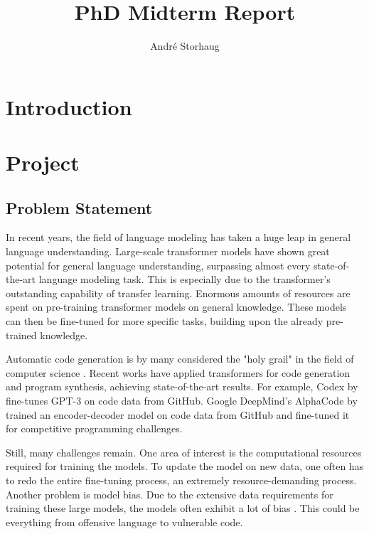 \documentclass{article}
\title{PhD Midterm Report}
\author{Andr\'e Storhaug}
\begin{document}
\maketitle


\tableofcontents


\section{Introduction}


\section{Project}

\subsection{Problem Statement}
In recent years, the field of language modeling has taken a huge leap in general language understanding. Large-scale transformer models \cite{vaswani2017attention} have shown great potential for general language understanding, surpassing almost every state-of-the-art language modeling task. This is especially due to the transformer's outstanding capability of transfer learning. Enormous amounts of resources are spent on pre-training transformer models on general knowledge. These models can then be fine-tuned for more specific tasks, building upon the already pre-trained knowledge.

Automatic code generation is by many considered the "holy grail" in the field of computer science \cite{PGL-010}. Recent works have applied transformers for code generation and program synthesis, achieving state-of-the-art results. For example, Codex by \textcite{chen2021codex} fine-tunes GPT-3 \cite{brown2020language} on code data from GitHub. Google DeepMind's AlphaCode by \textcite{li2022competition} trained an encoder-decoder model on code data from GitHub and fine-tuned it for competitive programming challenges.

Still, many challenges remain. One area of interest is the computational resources required for training the models. To update the model on new data, one often has to redo the entire fine-tuning process, an extremely resource-demanding process. Another problem is model bias. Due to the extensive data requirements for training these large models, the models often exhibit a lot of bias \cite{chen2021codex}. This could be everything from offensive language to vulnerable code.
\end{document}
